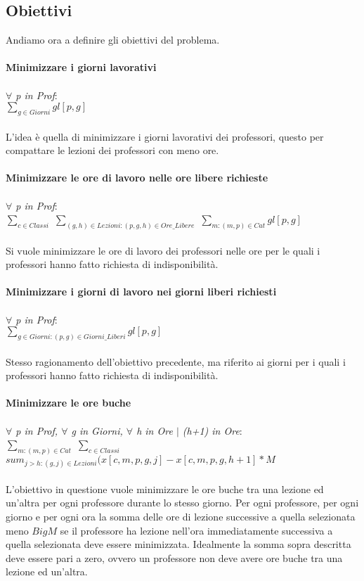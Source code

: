 \documentclass{article}
\begin{document}
\subsection{Obiettivi}
Andiamo ora a definire gli obiettivi del problema.
\\\\\textbf{Minimizzare i giorni lavorativi}
	\\\\\emph{$\forall$ p in Prof}:
	\\$\sum_{g \in Giorni}gl[p,g]$
\\\\L'idea è quella di minimizzare i giorni lavorativi dei professori, questo per compattare le lezioni dei professori con meno ore.
\\\\\textbf{Minimizzare le ore di lavoro nelle ore libere richieste}
	\\\\\emph{$\forall$ p in Prof}:
	\\$\sum_{c \in Classi}$ $\sum_{(g,h) \in Lezioni : (p,g,h) \in Ore\_Libere}$ $\sum_{m : (m,p) \in Cat}gl[p,g]$
\\\\Si vuole minimizzare le ore di lavoro dei professori nelle ore per le quali i professori hanno fatto richiesta di indisponibilità.
\\\\\textbf{Minimizzare i giorni di lavoro nei giorni liberi richiesti}
	\\\\\emph{$\forall$ p in Prof}:
	\\$\sum_{g \in Giorni : (p,g) \in Giorni\_Liberi}gl[p,g]$
\\\\Stesso ragionamento dell'obiettivo precedente, ma riferito ai giorni per i quali i professori hanno fatto richiesta di indisponibilità.
\\\\\textbf{Minimizzare le ore buche}
	\\\\\emph{$\forall$ p in Prof, $\forall$ g in Giorni, $\forall$ h in Ore $\mid$ (h+1) in Ore}:
	\\$\sum_{m : (m,p) \in Cat}$ $\sum_{c \in Classi}$ $sum_{j>h : (g,j) \in Lezioni}(x[c,m,p,g,j]-x[c,m,p,g,h+1]*M$
\\\\L'obiettivo in questione vuole minimizzare le ore buche tra una lezione ed un'altra per ogni professore durante lo stesso giorno. Per ogni professore, per ogni giorno e per ogni ora la somma delle ore di lezione successive a quella selezionata meno $Big M$ se il professore ha lezione nell'ora immediatamente successiva a quella selezionata deve essere minimizzata. Idealmente la somma sopra descritta deve essere pari a zero, ovvero un professore non deve avere ore buche tra una lezione ed un'altra.
\end{document}
